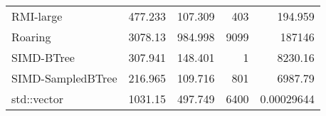 \begin{tabular}{lrrrr}
 RMI-large         &                477.233 &               107.309 &          403 &    194.959      \\
 Roaring           &               3078.13  &               984.998 &         9099 & 187146          \\
 SIMD-BTree        &                307.941 &               148.401 &            1 &   8230.16       \\
 SIMD-SampledBTree &                216.965 &               109.716 &          801 &   6987.79       \\
 std::vector       &               1031.15  &               497.749 &         6400 &      0.00029644 \\
\hline
\end{tabular}